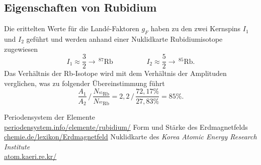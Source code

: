 \subsection{Eigenschaften von Rubidium}
Die erittelten Werte für die Landé-Faktoren $g_F$ haben zu den zwei Kernspins $I_1$ und $I_2$ geführt und werden anhand einer Nuklidkarte \cite{Spin} Rubidiumisotope
zugewiesen
\begin{equation}
 I_1 \approx \frac32 \rightarrow\, ^{87}\text{Rb} \hspace{2cm} I_2 \approx \frac52 \rightarrow\, ^{85}\text{Rb}.
\end{equation}
Das Verhältnis der Rb-Isotope \cite{Spin} wird mit dem Verhältnis der Amplituden verglichen, was zu folgender Übereinstimmung führt
\begin{equation}
 \frac{A_1}{A_2}\, /\, \frac{N_{^{85}\text{Rb}}}{N_{^{87}\text{Rb}}} = 2,2 \,/\, \frac{72,17\%}{27,83\%} =85\% .
\end{equation}



\begin{thebibliography}{xxxxxxxxxxx}
 Periodensystem der Elemente\\ \href{http://www.periodensystem.info/elemente/rubidium/}{periodensystem.info/elemente/rubidium/}
 Form und Stärke des Erdmagnetfelds\\ \href{http://www.chemie.de/lexikon/Erdmagnetfeld.html#Form_und_St.C3.A4rke_des_Erdmagnetfeldes}{chemie.de/lexikon/Erdmagnetfeld}
 Nuklidkarte des \textit{Korea Atomic Energy Research Institute}\\ \href{http://atom.kaeri.re.kr/}{atom.kaeri.re.kr/}
\end{thebibliography}






